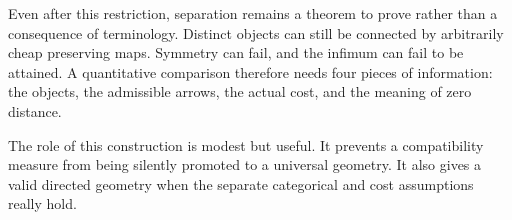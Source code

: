 Even after this restriction, separation remains a theorem to prove rather than a consequence of terminology. Distinct objects can still be connected by arbitrarily cheap preserving maps. Symmetry can fail, and the infimum can fail to be attained. A quantitative comparison therefore needs four pieces of information: the objects, the admissible arrows, the actual cost, and the meaning of zero distance.

The role of this construction is modest but useful. It prevents a compatibility measure from being silently promoted to a universal geometry. It also gives a valid directed geometry when the separate categorical and cost assumptions really hold.
